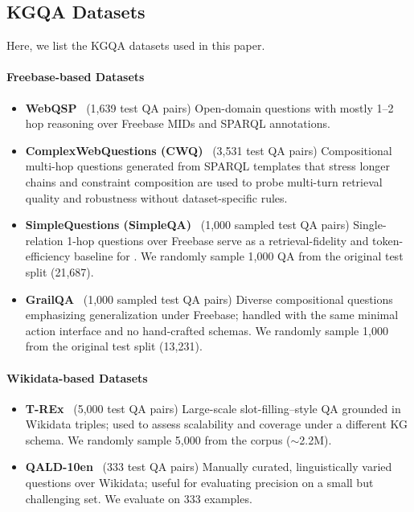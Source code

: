\subsection{KGQA Datasets}
Here, we list the KGQA datasets used in this paper.

\paragraph{Freebase-based Datasets}

\begin{itemize}[topsep=1pt,itemsep=2pt,parsep=0pt,leftmargin=10pt]
\item \textbf{WebQSP}~\citep{Yih2016WebQSP} (1,639 test QA pairs)
Open-domain questions with mostly 1--2 hop reasoning over Freebase MIDs and SPARQL annotations.

\item \textbf{ComplexWebQuestions (CWQ)}~\citep{Talmor2018CWQ} (3,531 test QA pairs)
Compositional multi-hop questions generated from SPARQL templates that stress longer chains and constraint composition are used to probe multi-turn retrieval quality and robustness without dataset-specific rules.

\item \textbf{SimpleQuestions (SimpleQA)}~\citep{bordes2015simplequestions} (1,000 sampled test QA pairs)
Single-relation 1-hop questions over Freebase serve as a retrieval-fidelity and token-efficiency baseline for \framework{}. We randomly sample 1{,}000 QA from the original test split (21{,}687).

\item \textbf{GrailQA}~\citep{gu2021grailqa} (1,000 sampled test QA pairs)
Diverse compositional questions emphasizing generalization under Freebase; handled with the same minimal action interface and no hand-crafted schemas. We randomly sample 1{,}000 from the original test split (13{,}231).
\end{itemize}

\paragraph{Wikidata-based Datasets}

\begin{itemize}[topsep=1pt,itemsep=2pt,parsep=0pt,leftmargin=10pt]
\item \textbf{T-REx}~\citep{elsahar2018trex} (5,000 test QA pairs)
Large-scale slot-filling–style QA grounded in Wikidata triples; used to assess scalability and coverage under a different KG schema. We randomly sample 5{,}000 from the corpus (\(\sim\)2.2M).

\item \textbf{QALD-10en}~\citep{usbeck2023qald10} (333 test QA pairs)
Manually curated, linguistically varied questions over Wikidata; useful for evaluating precision on a small but challenging set. We evaluate on 333 examples.
\end{itemize}




